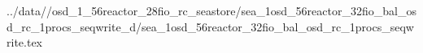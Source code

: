 ../data//osd_1_56reactor_28fio_rc_seastore/sea_1osd_56reactor_32fio_bal_osd_rc_1procs_seqwrite_d/sea_1osd_56reactor_32fio_bal_osd_rc_1procs_seqwrite.tex